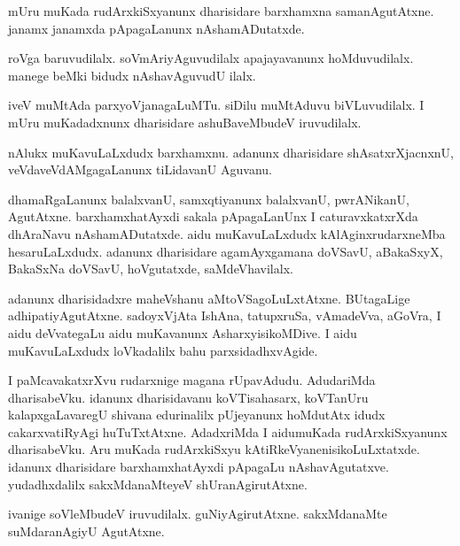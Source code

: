 \documentclass{article}
\begin{document}
\begin{mng}%
mUru muKada rudArxkiSxyanunx dharisidare barxhamxna samanAgutAtxne. 
janamx janamxda pApagaLanunx nAshamADutatxde.
\end{mng}

\begin{mng}%
roVga baruvudilalx. soVmAriyAguvudilalx apajayavanunx hoMduvudilalx. 
manege beMki bidudx nAshavAguvudU ilalx.
\end{mng}

\begin{mng}%
iveV muMtAda parxyoVjanagaLuMTu. siDilu muMtAduvu biVLuvudilalx. I 
mUru muKadadxnunx dharisidare ashuBaveMbudeV iruvudilalx.
\end{mng}

\begin{mng}%
nAlukx muKavuLaLxdudx barxhamxnu. adanunx dharisidare 
shAsatxrXjacnxnU, veVdaveVdAMgagaLanunx tiLidavanU Aguvanu.
\end{mng}

\begin{mng}%
dhamaRgaLanunx balalxvanU, samxqtiyanunx balalxvanU, pwrANikanU, 
AgutAtxne. barxhamxhatAyxdi sakala pApagaLanUnx I caturavxkatxrXda 
dhAraNavu nAshamADutatxde. aidu muKavuLaLxdudx kAlAginxrudarxneMba 
hesaruLaLxdudx. adanunx dharisidare agamAyxgamana doVSavU, aBakaSxyX, 
BakaSxNa doVSavU, hoVgutatxde, saMdeVhavilalx.
\end{mng}

\begin{mng}%
adanunx dharisidadxre maheVshanu aMtoVSagoLuLxtAtxne. BUtagaLige 
adhipatiyAgutAtxne. sadoyxVjAta IshAna, tatupxruSa, vAmadeVva, aGoVra, 
I aidu deVvategaLu aidu muKavanunx AsharxyisikoMDive. I aidu 
muKavuLaLxdudx loVkadalilx bahu parxsidadhxvAgide.
\end{mng}

\begin{mng}%
I paMcavakatxrXvu rudarxnige magana rUpavAdudu. AdudariMda 
dharisabeVku. idanunx dharisidavanu koVTisahasarx, koVTanUru 
kalapxgaLavaregU shivana edurinalilx pUjeyanunx hoMdutAtx idudx 
cakarxvatiRyAgi huTuTxtAtxne. AdadxriMda I aidumuKada rudArxkiSxyanunx 
dharisabeVku. Aru muKada rudArxkiSxyu kAtiRkeVyanenisikoLuLxtatxde. 
idanunx dharisidare barxhamxhatAyxdi pApagaLu nAshavAgutatxve. 
yudadhxdalilx sakxMdanaMteyeV shUranAgirutAtxne.
\end{mng}

\begin{mng}%
ivanige  soVleMbudeV iruvudilalx. guNiyAgirutAtxne. sakxMdanaMte 
suMdaranAgiyU AgutAtxne.
\end{mng}
\end{document}
